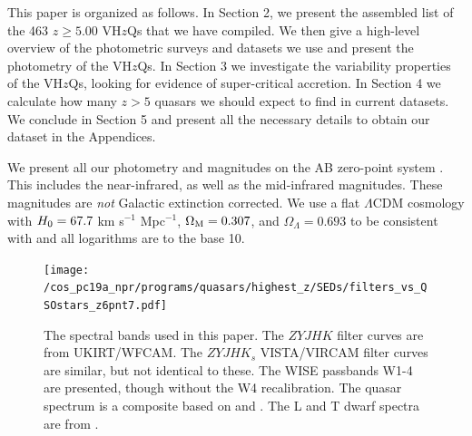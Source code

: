 \documentclass[usenatbib]{mnras}
\begin{document}
This paper is organized as follows. In Section 2, we present the
assembled list of the 463 $z\geq5.00$ VH$z$Qs that we have
compiled. We then give a high-level overview of the photometric
surveys and datasets we use and present the photometry of the
VH$z$Qs. In Section 3 we investigate the variability properties of the
VH$z$Qs, looking for evidence of super-critical accretion. In Section
4 we calculate how many $z>5$ quasars we should expect to find in
current datasets. We conclude in Section 5 and present all the
necessary details to obtain our dataset in the Appendices.

We present all our photometry and magnitudes on the AB zero-point
system \citep{Oke_Gunn1983, Fukugita1996}.  This includes the
near-infrared, as well as the mid-infrared magnitudes. These
magnitudes are {\it not} Galactic extinction corrected. We use a flat
$\Lambda$CDM cosmology with $H_{\rm 0} = 67.7$ km s$^{-1}$ Mpc$^{-1}$,
$\Omega_{\rm M} = 0.307$, and $\Omega_{\Lambda} = 0.693$
\citet{Planck2016} to be consistent with \citet{Banados2016} and all
logarithms are to the base 10.


\begin{figure}
  \texttt{[image: /cos\_pc19a\_npr/programs/quasars/highest\_z/SEDs/filters\_vs\_QSOstars\_z6pnt7.pdf]}
  \centering
  \vspace{-12pt}
  \caption[]
  {The spectral bands used in this paper. 
    The $ZYJHK$ filter curves are from UKIRT/WFCAM.  
    The $ZYJHK_{s}$ VISTA/VIRCAM filter curves are similar, but not identical to these. 
    The WISE passbands W1-4 are presented, though without the \citet{Brown2014b} W4 recalibration. 
    The quasar spectrum is a composite based on \citet{VdB2001} and 
    \citet{Banados2016}. The L and T dwarf spectra are from \citet{Cushing2006}. }
  \label{fig:filters}
\end{figure}
\end{document}
